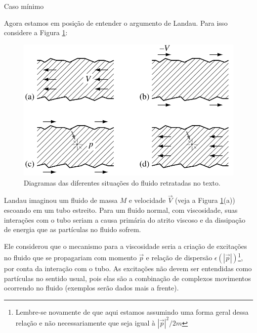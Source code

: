 \documentclass[]{IMTexam}
\begin{document}
\begin{questions}
\begin{parts}
\begin{solution}
\begin{multi}[3]

				Caso mínimo
			\end{multi}

			\hfill\qedsymbol
		\end{solution}
	\end{parts}

	\medskip

	\question \label{ques:q2}
	Agora estamos em posição de entender o argumento de Landau. Para isso considere a Figura \ref{fig:fig1}:

	\begin{figure}[H]
		\centering
		\includegraphics[width=0.5\linewidth]{screenshot001}
		\caption{Diagramas das diferentes situações do fluido retratadas no texto.}
		\label{fig:fig1}
	\end{figure}

	Landau imaginou um fluido de massa $ M $ e velocidade $\vec{V}$ (veja a Figura \ref{fig:fig1}(a)) escoando em um tubo estreito. Para um fluido normal, com viscosidade, suas interações com o tubo seriam a causa primária do atrito viscoso e da dissipação de energia que as partículas no fluido sofrem.

	Ele considerou que o mecanismo para a viscosidade seria a criação de excitações no fluido que se propagariam com momento $\vec{p}$ e relação de dispersão $\epsilon(|\vec{p}|)$\footnote{Lembre-se novamente de que aqui estamos assumindo uma forma geral dessa relação e não necessariamente que seja igual à $ |\vec{p}|^{2}/2m $}, por conta da interação com o tubo. As excitações não devem ser entendidas como partículas no sentido usual, pois elas são a combinação de complexos movimentos ocorrendo no fluido (exemplos serão dados mais a frente).


\end{questions}
\end{document}
